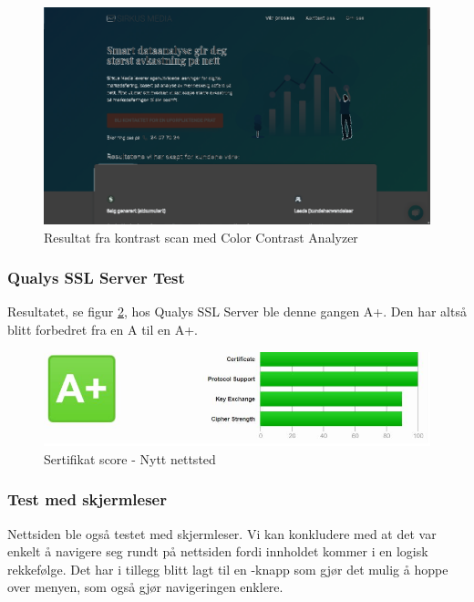 \begin{figure}[H]
    \centering
    \includegraphics[width=\textwidth]{bjornar/contrast-new.png}
    \caption{Resultat fra kontrast scan med Color Contrast Analyzer}
    \label{fig:analysis-new-contrast}
\end{figure}

\subsubsection{Qualys SSL Server Test}
Resultatet, se figur \ref{fig:analysis-new-ssl-test}, hos Qualys SSL Server ble denne gangen A+. Den har altså blitt forbedret fra en A til en A+.

\begin{figure}[H]
    \centering
    \includegraphics[width=\textwidth]{bereket/QSST-test.png}
    \caption{Sertifikat score - Nytt nettsted}
    \label{fig:analysis-new-ssl-test}
\end{figure}

\subsubsection{Test med skjermleser}
Nettsiden ble også testet med skjermleser. Vi kan konkludere med at det var enkelt å navigere seg rundt på nettsiden fordi innholdet kommer i en logisk rekkefølge. Det har i tillegg blitt lagt til en -knapp som gjør det mulig å hoppe over menyen, som også gjør navigeringen enklere.

